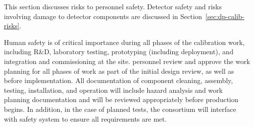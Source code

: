 
This section discusses risks to personnel safety. Detector safety and risks involving damage to detector components are discussed in Section~\ref{sec:dp-calib-risks}.

Human safety is of critical importance during all phases of the calibration work, including R\&D, laboratory testing, prototyping (including  deployment), and integration and commissioning at the   site.   personnel review and approve the work planning for all phases of work as part of the initial design review, as well as before implementation. All documentation of component cleaning, assembly, testing, installation, and operation will include hazard analysis and work planning documentation and will be reviewed appropriately before production begins. In addition, in the case of planned  tests, the consortium will interface with  safety system to ensure all requirements are met.

